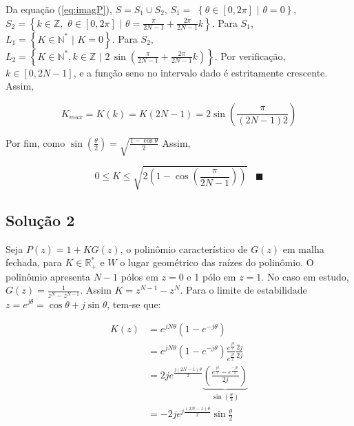     Da equação (\ref{eq:imagP}), $S = S_1 \cup S_2$, $S_1 = $ $ \left\{\theta \in [0, 2 \pi] \,\, \Bigr| \,\, \theta = 0\right\}$, $S_2 = \left\{k \in \mathbb{Z}, \,\, \theta \in [0, 2 \pi] \,\, \Bigr| \,\, \theta = \frac{\pi}{2N - 1} + \frac{2 \pi}{2N - 1} k\right\}$. Para $S_1$, $L_1 = \left\{K \in \mathbb{N}^* \,\, \Bigr| \,\, K = 0\right\}$. Para $S_2$, $L_2 = \left\{K \in \mathbb{N}^*, k \in \mathbb{Z} \,\, \Bigr| \,\, 2 \, \sin\left(\frac{\pi}{2N-1} + \frac{2 \pi}{2N-1} k\right)\right\}$. Por verificação, $k \in [0, 2N -1]$, e a função seno no intervalo dado é estritamente crescente. Assim, 
    
        \begin{equation}
            K_{max} = K(k) = K(2N - 1) = 2 \sin\left(\frac{\pi}{(2N - 1) 2}\right)
        \end{equation}
    
    Por fim, como $\sin(\frac{\theta}{2}) = \sqrt{\frac{1 - \cos{\theta}}{2}}$ Assim,
    
        \begin{equation}
            0 \leq K \leq \sqrt{2 \left(1 - \cos\left(\frac{\pi}{2N - 1}\right)\right)} \hspace{10pt} \blacksquare
        \end{equation}

\subsection*{Solução 2}

    Seja $P(z) = 1 + K G(z)$, o polinômio característico de $G(z)$ em malha fechada, para $K \in \mathbb{R}^*_{+}$ e $W$ o lugar geométrico das raízes do polinômio. O polinômio apresenta $N-1$ pólos em $z = 0$ e 1 pólo em $z = 1$. No caso em estudo, $G(z) = \frac{1}{z^{N} - z^{N-1}}$.  Assim $K = z^{N - 1} - z^N$. Para o limite de estabilidade $z = e^{j\theta} = \cos{\theta} + j \sin{\theta}$, tem-se que:
    
    \begin{equation}
        \begin{split}
            K(z) & = e^{j N \theta} \left(1 - e^{-j \theta}\right) \\
             & = e^{j N \theta} \left(1 - e^{-j \theta}\right)  \frac{e^{\frac{j\theta}{2}}}{e^{\frac{j\theta}{2}}} \frac{2j}{2j} \\
             & = 2 j e^{\frac{j (2N - 1) \theta}{2}} \underbrace{\left(\frac{e^{\frac{j \theta}{2}} - e^{\frac{- j \theta}{2}}}{2 j}\right)}_{\sin(\frac{\theta}{2})} \\
             & = -2 j e^{j \frac{(2N - 1) \theta}{2}} \sin{\frac{\theta}{2}}
        \end{split}    
    \end{equation}
    
